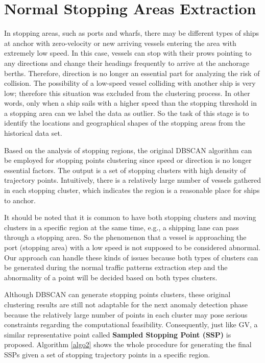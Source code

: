 \documentclass[12pt,glossary]{dalcsthesis}
\begin{document}

\section{Normal Stopping Areas Extraction}
\label{sec:normal_stopping_model}

In stopping areas, such as ports and wharfs, there may be different types of ships at anchor with zero-velocity or new arriving vessels entering the area with extremely low speed. In this case, vessels can stop with their prows pointing to any directions and change their headings frequently to arrive at the anchorage berths. Therefore, direction is no longer an essential part for analyzing the risk of collision. The possibility of a low-speed vessel colliding with another ship is very low; therefore this situation was excluded from the clustering process. In other words, only when a ship sails with a higher speed than the stopping threshold in a stopping area can we label the data as outlier. So the task of this stage is to identify the locations and geographical shapes of the stopping areas from the historical data set.


Based on the analysis of stopping regions,  the original DBSCAN \cite{DBScan96} algorithm can be employed for stopping points clustering since speed or direction is no longer essential factors. The output is a set of stopping clusters with high density of trajectory points. Intuitively, there is a relatively large number of vessels gathered in each stopping cluster, which indicates the region is a reasonable place for ships to anchor. 

It should be noted that it is common to have both stopping clusters and moving clusters in a specific region at the same time, e.g., a shipping lane can pass through a stopping area. So the phenomenon that a vessel is approaching the port (stopping area) with a low speed is not supposed to be considered abnormal.  Our approach can handle these kinds of issues because both types of clusters can be generated during the normal traffic patterns extraction step and the abnormality of a point will be decided based on both types clusters.



Although DBSCAN \cite{DBScan96} can generate stopping points clusters, these original clustering results are still not adaptable for the next anomaly detection phase because the relatively large number of points in each cluster may pose serious constraints regarding the computational feasibility. Consequently, just like GV, a similar representative point called  \textbf{Sampled Stopping Point (SSP)} is proposed. Algorithm \ref{algo2} shows the whole procedure for generating the final SSPs given a set of stopping trajectory points in a specific region. 
\end{document}
